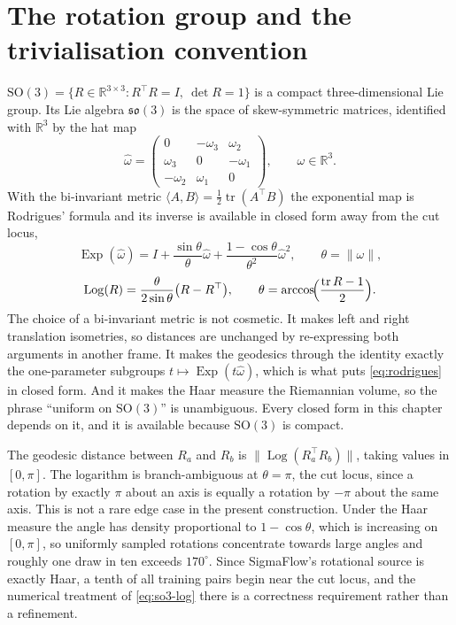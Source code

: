 \documentclass[11pt,a4paper]{report}
\theoremstyle{plain}
\theoremstyle{definition}
\theoremstyle{remark}
\newcommand{\R}{\mathbb{R}}
\newcommand{\SOthree}{\mathrm{SO}(3)}
\newcommand{\sothree}{\mathfrak{so}(3)}
\newcommand{\Exp}{\operatorname{Exp}}
\newcommand{\Log}{\operatorname{Log}}
\newcommand{\Tr}{\operatorname{tr}}
\newcommand{\skewm}[1]{\widehat{#1}}
\newcommand{\Rot}{R}
\newcommand{\Ang}[1]{\ensuremath{#1^{\circ}}}
\begin{document}
\section{The rotation group and the trivialisation convention}
\label{sec:so3}

$\SOthree = \{\Rot\in\R^{3\times3} : \Rot^\top\Rot = I,\ \det\Rot = 1\}$ is a
compact three-dimensional Lie group. Its Lie algebra $\sothree$ is the space of
skew-symmetric matrices, identified with $\R^3$ by the hat map
\begin{equation}
  \skewm{\omega} =
  \begin{pmatrix}
    0 & -\omega_3 & \omega_2\\
    \omega_3 & 0 & -\omega_1\\
    -\omega_2 & \omega_1 & 0
  \end{pmatrix},
  \qquad \omega\in\R^3 .
\end{equation}
With the bi-invariant metric $\langle A,B\rangle = \tfrac12\Tr(A^\top B)$ the
exponential map is Rodrigues' formula and its inverse is available in closed
form away from the cut locus,
\begin{equation}
  \Exp(\skewm{\omega}) = I + \frac{\sin\theta}{\theta}\skewm{\omega}
    + \frac{1-\cos\theta}{\theta^{2}}\skewm{\omega}^{2},
  \qquad \theta = \|\omega\| ,
  \label{eq:rodrigues}
\end{equation}
\begin{equation}
  \Log(\Rot) = \frac{\theta}{2\sin\theta}\bigl(\Rot - \Rot^\top\bigr),
  \qquad
  \theta = \arccos\!\Bigl(\frac{\Tr \Rot - 1}{2}\Bigr).
  \label{eq:so3-log}
\end{equation}
The choice of a bi-invariant metric is not cosmetic. It makes left and right
translation isometries, so distances are unchanged by re-expressing both
arguments in another frame. It makes the geodesics through the identity
exactly the one-parameter subgroups $t \mapsto \Exp(t\skewm{\omega})$, which is
what puts \eqref{eq:rodrigues} in closed form. And it makes the Haar measure
the Riemannian volume, so the phrase ``uniform on $\SOthree$'' is unambiguous.
Every closed form in this chapter depends on it, and it is available because
$\SOthree$ is compact.

The geodesic distance between $\Rot_a$ and $\Rot_b$ is
$\|\Log(\Rot_a^\top\Rot_b)\|$, taking values in $[0,\pi]$. The logarithm is
branch-ambiguous at $\theta = \pi$, the cut locus, since a rotation by exactly
$\pi$ about an axis is equally a rotation by $-\pi$ about the same axis. This
is not a rare edge case in the present construction. Under the Haar measure
the angle has density proportional to $1 - \cos\theta$, which is increasing on
$[0,\pi]$, so uniformly sampled rotations concentrate towards large angles and
roughly one draw in ten exceeds $\Ang{170}$. Since SigmaFlow's rotational
source is exactly Haar, a tenth of all training pairs begin near the cut locus,
and the numerical treatment of \eqref{eq:so3-log} there is a correctness
requirement rather than a refinement.
\end{document}
